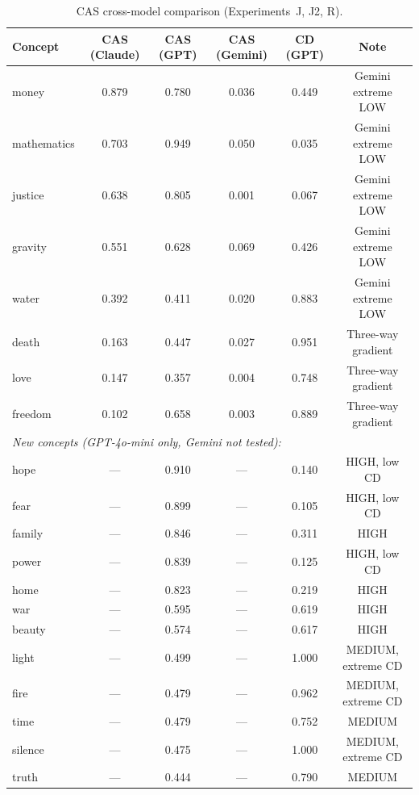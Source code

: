 \documentclass[11pt,a4paper]{article}
\begin{document}
\begin{table}[H]
\centering
\caption{CAS cross-model comparison (Experiments~J, J2, R).}
\small
\begin{tabular}{lccccc}
\toprule
\textbf{Concept} & \textbf{CAS (Claude)} & \textbf{CAS (GPT)} & \textbf{CAS (Gemini)} & \textbf{CD (GPT)} & \textbf{Note} \\
\midrule
money       & 0.879 & 0.780 & 0.036 & 0.449 & Gemini extreme LOW \\
mathematics & 0.703 & 0.949 & 0.050 & 0.035 & Gemini extreme LOW \\
justice     & 0.638 & 0.805 & 0.001 & 0.067 & Gemini extreme LOW \\
gravity     & 0.551 & 0.628 & 0.069 & 0.426 & Gemini extreme LOW \\
water       & 0.392 & 0.411 & 0.020 & 0.883 & Gemini extreme LOW \\
death       & 0.163 & 0.447 & 0.027 & 0.951 & Three-way gradient \\
love        & 0.147 & 0.357 & 0.004 & 0.748 & Three-way gradient \\
freedom     & 0.102 & 0.658 & 0.003 & 0.889 & Three-way gradient \\
\midrule
\multicolumn{6}{l}{\emph{New concepts (GPT-4o-mini only, Gemini not tested):}} \\
hope        & ---   & 0.910 & ---   & 0.140 & HIGH, low CD \\
fear        & ---   & 0.899 & ---   & 0.105 & HIGH, low CD \\
family      & ---   & 0.846 & ---   & 0.311 & HIGH \\
power       & ---   & 0.839 & ---   & 0.125 & HIGH, low CD \\
home        & ---   & 0.823 & ---   & 0.219 & HIGH \\
war         & ---   & 0.595 & ---   & 0.619 & HIGH \\
beauty      & ---   & 0.574 & ---   & 0.617 & HIGH \\
light       & ---   & 0.499 & ---   & 1.000 & MEDIUM, extreme CD \\
fire        & ---   & 0.479 & ---   & 0.962 & MEDIUM, extreme CD \\
time        & ---   & 0.479 & ---   & 0.752 & MEDIUM \\
silence     & ---   & 0.475 & ---   & 1.000 & MEDIUM, extreme CD \\
truth       & ---   & 0.444 & ---   & 0.790 & MEDIUM \\
\bottomrule
\end{tabular}
\label{tab:cas-crossmodel}
\end{table}
\end{document}
